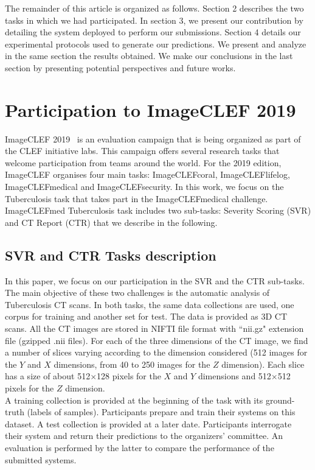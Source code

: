 \documentclass{llncs}
\begin{document}
The remainder of this article is organized as follows. Section 2 describes the two tasks in which we had participated. In section 3, we present our contribution by detailing the system deployed to perform our submissions. Section 4 details our experimental protocols used to generate our predictions. We present and analyze in the same section the results obtained. We make our conclusions in the last section by presenting potential perspectives and future works.

\section{Participation to ImageCLEF 2019}

ImageCLEF 2019~\cite{ImageCLEF19} is an evaluation campaign that is being organized as part of the CLEF initiative labs. This campaign offers several research tasks that welcome participation from teams around the world. For the 2019 edition, ImageCLEF organises four main tasks: ImageCLEFcoral, ImageCLEFlifelog, ImageCLEFmedical and ImageCLEFsecurity. In this work, we focus on the Tuberculosis task that takes part in the ImageCLEFmedical challenge. ImageCLEFmed Tuberculosis task includes two sub-tasks: Severity Scoring (SVR) and CT Report (CTR) that we describe in the following.

\subsection{SVR and CTR Tasks description}
In this paper, we focus on our participation in the SVR and the CTR sub-tasks. The main objective of these two challenges is the automatic analysis of Tuberculosis CT scans. In both tasks, the same data collections are used, one corpus for training and another set for test. The data is provided as 3D CT scans. All the CT images are stored in NIFTI file format with ``nii.gz" extension file (gzipped .nii files). For each of the three dimensions of the CT image, we find a number of slices varying according to the dimension considered (512 images for the $Y$ and $X$ dimensions, from 40 to 250 images for the $Z$ dimension). Each slice has a size of about 512$\times$128 pixels for the $X$ and $Y$ dimensions and 512$\times$512 pixels for the $Z$ dimension.\\

A training collection is provided at the beginning of the task with its ground-truth (labels of samples). Participants prepare and train their systems on this dataset. A test collection is provided at a later date. Participants interrogate their system and return their predictions to the organizers' committee. An evaluation is performed by the latter to compare the performance of the submitted systems.
\end{document}
